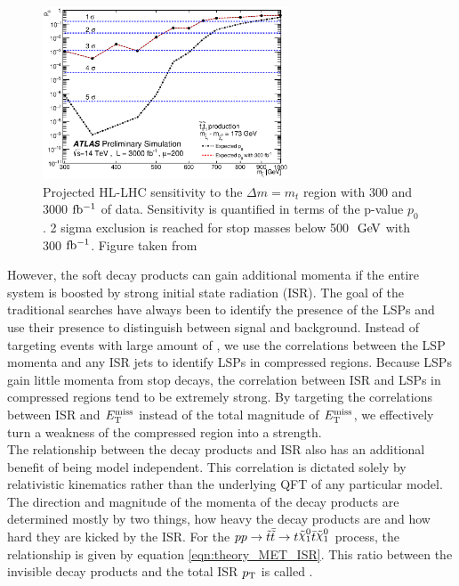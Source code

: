 \begin{figure}[h!]
  \centering
	\includegraphics[width=0.65\textwidth]{./figures/strategy/HLLHC_pvalue.eps}
\caption{Projected HL-LHC sensitivity to the $\Delta m = m_t$ region with 300 and 3000 $\mbox{fb$^{-1}$}$ of data.  Sensitivity is quantified in terms of the p-value $p_0$.  2 sigma exclusion is reached for stop masses below 500 $\gev$ with 300 $\mbox{fb$^{-1}$}$. Figure taken from \cite{HLLHC_stop }}
\label{fig:HL_LHC:p_value}
\end{figure}

\indent However, the soft decay products can gain additional momenta if the entire system is boosted by strong initial state radiation (ISR).  The goal of the traditional searches have always been to identify the presence of the LSPs and use their presence to distinguish between signal and background.  Instead of targeting events with large amount of \MET, we use the correlations between the LSP momenta and any ISR jets to identify LSPs in compressed regions.\cite{Pheno1,Pheno2}  Because LSPs gain little momenta from stop decays, the correlation between ISR and LSPs in compressed regions tend to be extremely strong.  By targeting the correlations between ISR and $E_{\mathrm{T}}^{\mathrm{miss}}$ instead of the total magnitude of $E_{\mathrm{T}}^{\mathrm{miss}}$, we effectively turn a weakness of the compressed region into a strength. \\

\indent The relationship between the decay products and ISR also has an additional benefit of being model independent.  This correlation is dictated solely by relativistic kinematics rather than the underlying QFT of any particular model.  The direction and magnitude of the momenta of the decay products are determined mostly by two things, how heavy the decay products are and how hard they are kicked by the ISR. For the $p p \rightarrow \antibar{\stop} \rightarrow t\ninoone\tbar\ninoone$ process, the relationship is given by equation \ref{eqn:theory_MET_ISR}. This ratio between the invisible decay products and the total ISR $p_{\mathrm{T}}$ is called \RISR. \\

